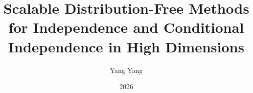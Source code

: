 \documentclass[12pt,reqno,oneside]{amsbook}
\theoremstyle{definition}
\theoremstyle{remark}
\begin{document}

\newcommand{\thetitle}
{Scalable Distribution-Free Methods for Independence and Conditional Independence in High Dimensions}

\newcommand{\institution}
{University of Illinois Chicago}

\newcommand{\degree}
{Doctor of Philosophy in Mathematics}

\newcommand{\programname}
{Mathematics}

\newcommand{\committee}
{Ping-Shou Zhong, Chair and Advisor \\
Jie Yang \\
Min Yang \\
Hua Yun Chen, Division of Epidemiology and Biostatistics \\
Kai Zhang, University of North Carolina at Chapel Hill}

\newcommand{\theauthor}
{Yang Yang}

\newcommand{\priordegrees}
{B.S., University of Science and Technology Beijing \\
M.S., Illinois Institute of Technology, 2014}

\newcommand{\graduationyear}
{2026}

\author{\theauthor}
\title{\thetitle}
\date{\graduationyear}


\frontmatter

\end{document}
